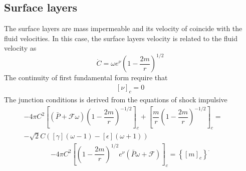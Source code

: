 \documentclass[notitlepage,letterpaper, 10pt]{article}
\begin{document}
\subsection{Surface layers}
The surface layers are mass impermeable and its velocity of coincide with the fluid velocities. In this case, the surface layers velocity is related to the fluid velocity as 
\begin{equation}
    \dot{C}=\omega e^{\nu} \left(1-\dfrac{2m}{r} \right)^{1/2} 
\end{equation}
The continuity of first fundamental form require that 
\begin{eqnarray}
    \left[ \nu \right]_{c}=0 
\end{eqnarray}
The junction conditions is derived from the equations of shock impulsive
\begin{align}
    -4\pi C^{2} \left[\left(\bar{P}+ \mathcal{F}\omega \right) \left(1-\dfrac{2m}{r} \right)^{-1/2}  \right]_{c} + \left[ \dfrac{m}{r}  \left(1-\dfrac{2m}{r} \right)^{-1/2} \right]_{c}= \quad \quad 
    \nonumber \\
    -\sqrt{2} C \left( \left[\gamma \right]\left( \omega-1\right)- \left[ \epsilon \right]\left( \omega+1\right)  \right)
\end{align}
\begin{align}
    -4\pi C^{2}\left[  \left(1-\dfrac{2m}{r} \right)^{1/2} e^{\nu}\left( \bar{P}\omega + \mathcal{F}\right)\right]_{c}= \left \{ \left[ m\right]_{c}  \right \}^{.}
\end{align}
\end{document}
